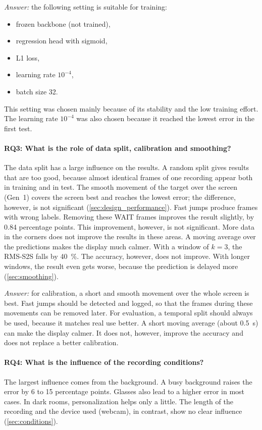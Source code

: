 \emph{Answer:} the following setting is suitable for training:
\begin{itemize}[nosep]
  \item frozen backbone (not trained),
  \item regression head with sigmoid,
  \item L1 loss,
  \item learning rate $10^{-4}$,
  \item batch size 32.
\end{itemize}
This setting was chosen mainly because of its stability and the low training
effort. The learning rate $10^{-4}$ was also chosen because it reached the
lowest error in the first test.

\paragraph{RQ3: What is the role of data split, calibration and smoothing?}
The data split has a large influence on the results. A random split gives
results that are too good, because almost identical frames of one recording
appear both in training and in test. The smooth movement of the target over
the screen (Gen~1) covers the screen best and reaches the lowest error; the
difference, however, is not significant (\cref{sec:design_performance}). Fast
jumps produce frames with wrong labels. Removing these WAIT frames improves the
result slightly, by \num{0.84} percentage points. This improvement, however, is
not significant. More data in the corners does not improve the results in these
areas. A moving average over the predictions makes the display much calmer.
With a window of $k=3$, the RMS-S2S falls by \SI{40}{\percent}. The accuracy,
however, does not improve. With longer windows, the result even gets worse,
because the prediction is delayed more (\cref{sec:smoothing}).

\emph{Answer:} for calibration, a short and smooth movement over the whole
screen is best. Fast jumps should be detected and logged, so that the frames
during these movements can be removed later. For evaluation, a temporal split
should always be used, because it matches real use better. A short moving
average (about \SI{0.5}{\second}) can make the display calmer. It does not,
however, improve the accuracy and does not replace a better calibration.

\paragraph{RQ4: What is the influence of the recording conditions?}
The largest influence comes from the background. A busy background raises the
error by 6 to 15 percentage points. Glasses also lead to a higher error in most
cases. In dark rooms, personalization helps only a little. The length of the
recording and the device used (webcam), in contrast, show no clear influence
(\cref{sec:conditions}).

